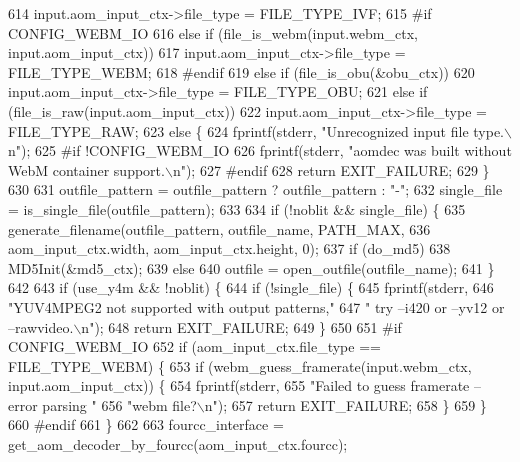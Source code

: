 \begin{DoxyCodeInclude}
{{{{{{{{{{{{{{{{{{{{{{{{{{{{{{614     input.aom\_input\_ctx->file\_type = FILE\_TYPE\_IVF;
615 \textcolor{preprocessor}{#if CONFIG\_WEBM\_IO}
616   \textcolor{keywordflow}{else} \textcolor{keywordflow}{if} (file\_is\_webm(input.webm\_ctx, input.aom\_input\_ctx))
617     input.aom\_input\_ctx->file\_type = FILE\_TYPE\_WEBM;
618 \textcolor{preprocessor}{#endif}
619   \textcolor{keywordflow}{else} \textcolor{keywordflow}{if} (file\_is\_obu(&obu\_ctx))
620     input.aom\_input\_ctx->file\_type = FILE\_TYPE\_OBU;
621   \textcolor{keywordflow}{else} \textcolor{keywordflow}{if} (file\_is\_raw(input.aom\_input\_ctx))
622     input.aom\_input\_ctx->file\_type = FILE\_TYPE\_RAW;
623   \textcolor{keywordflow}{else} \{
624     fprintf(stderr, \textcolor{stringliteral}{"Unrecognized input file type.\(\backslash\)n"});
625 \textcolor{preprocessor}{#if !CONFIG\_WEBM\_IO}
626     fprintf(stderr, \textcolor{stringliteral}{"aomdec was built without WebM container support.\(\backslash\)n"});
627 \textcolor{preprocessor}{#endif}
628     \textcolor{keywordflow}{return} EXIT\_FAILURE;
629   \}
630 
631   outfile\_pattern = outfile\_pattern ? outfile\_pattern : \textcolor{stringliteral}{"-"};
632   single\_file = is\_single\_file(outfile\_pattern);
633 
634   \textcolor{keywordflow}{if} (!noblit && single\_file) \{
635     generate\_filename(outfile\_pattern, outfile\_name, PATH\_MAX,
636                       aom\_input\_ctx.width, aom\_input\_ctx.height, 0);
637     \textcolor{keywordflow}{if} (do\_md5)
638       MD5Init(&md5\_ctx);
639     \textcolor{keywordflow}{else}
640       outfile = open\_outfile(outfile\_name);
641   \}
642 
643   \textcolor{keywordflow}{if} (use\_y4m && !noblit) \{
644     \textcolor{keywordflow}{if} (!single\_file) \{
645       fprintf(stderr,
646               \textcolor{stringliteral}{"YUV4MPEG2 not supported with output patterns,"}
647               \textcolor{stringliteral}{" try --i420 or --yv12 or --rawvideo.\(\backslash\)n"});
648       \textcolor{keywordflow}{return} EXIT\_FAILURE;
649     \}
650 
651 \textcolor{preprocessor}{#if CONFIG\_WEBM\_IO}
652     \textcolor{keywordflow}{if} (aom\_input\_ctx.file\_type == FILE\_TYPE\_WEBM) \{
653       \textcolor{keywordflow}{if} (webm\_guess\_framerate(input.webm\_ctx, input.aom\_input\_ctx)) \{
654         fprintf(stderr,
655                 \textcolor{stringliteral}{"Failed to guess framerate -- error parsing "}
656                 \textcolor{stringliteral}{"webm file?\(\backslash\)n"});
657         \textcolor{keywordflow}{return} EXIT\_FAILURE;
658       \}
659     \}
660 \textcolor{preprocessor}{#endif}
661   \}
662 
663   fourcc\_interface = get\_aom\_decoder\_by\_fourcc(aom\_input\_ctx.fourcc);
}}}}}}}}}}}}}}}}}}}}}}}}}}}}}}
\end{DoxyCodeInclude}
